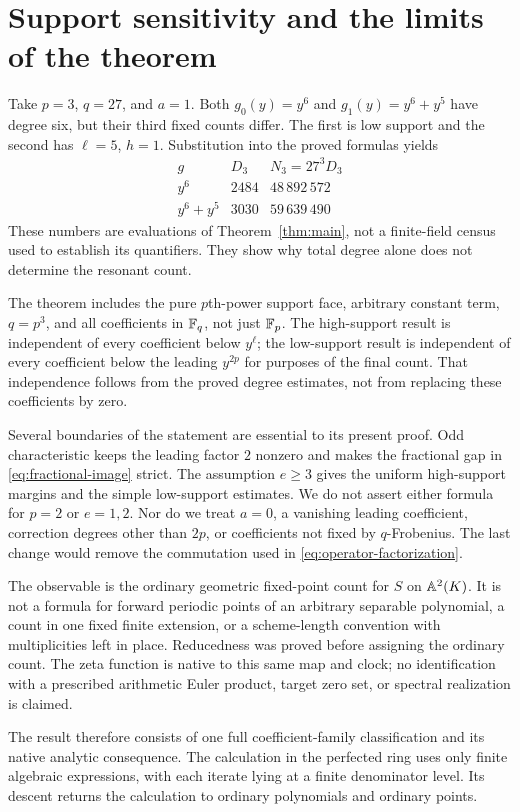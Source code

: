 \section{Support sensitivity and the limits of the theorem}\label{sec:scope}

\begin{example}\label{ex:q27}
Take $p=3$, $q=27$, and $a=1$. Both
$g_0(y)=y^6$ and $g_1(y)=y^6+y^5$ have degree six, but their
third fixed counts differ. The first is low support and the second
has $\ell=5$, $h=1$. Substitution into the proved formulas yields
\[
\begin{array}{c|r|r}
 g &D_3&N_3=27^3D_3\\\hline
 y^6&2484&48\,892\,572\\
 y^6+y^5&3030&59\,639\,490
\end{array}
\]
These numbers are evaluations of Theorem~\ref{thm:main}, not a
finite-field census used to establish its quantifiers. They show
why total degree alone does not determine the resonant count.
\end{example}

The theorem includes the pure $p$th-power support face, arbitrary
constant term, $q=p^3$, and all coefficients in $\mathbb F_q$, not just
$\mathbb F_p$. The high-support result is independent of every coefficient
below $y^\ell$; the low-support result is independent of every
coefficient below the leading $y^{2p}$ for purposes of the final
count. That independence follows from the proved degree estimates,
not from replacing these coefficients by zero.

Several boundaries of the statement are essential to its present
proof. Odd characteristic keeps the leading factor $2$ nonzero
and makes the fractional gap in \eqref{eq:fractional-image} strict.
The assumption $e\ge3$ gives the uniform high-support margins and
the simple low-support estimates. We do not assert either formula
for $p=2$ or $e=1,2$. Nor do we treat $a=0$, a vanishing leading
coefficient, correction degrees other than $2p$, or coefficients
not fixed by $q$-Frobenius. The last change would remove the
commutation used in \eqref{eq:operator-factorization}.

The observable is the ordinary geometric fixed-point count for
$S$ on $\mathbb A^2(K)$. It is not a formula for forward periodic points
of an arbitrary separable polynomial, a count in one fixed finite
extension, or a scheme-length convention with multiplicities left
in place. Reducedness was proved before assigning the ordinary
count. The zeta function is native to this same map and clock;
no identification with a prescribed arithmetic Euler product,
target zero set, or spectral realization is claimed.

The result therefore consists of one full coefficient-family
classification and its native analytic consequence. The calculation
in the perfected ring uses only finite algebraic expressions, with
each iterate lying at a finite denominator level. Its descent
returns the calculation to ordinary polynomials and ordinary points.
